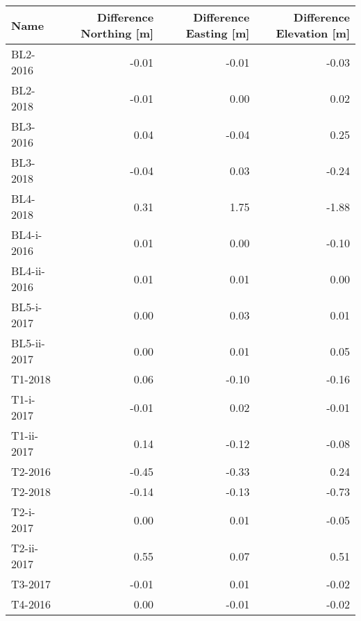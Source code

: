 \begin{tabular}{lrrr}
\toprule
        Name &  Difference Northing [m] &  Difference Easting [m] &  Difference Elevation [m] \\
\midrule
    BL2-2016 &                    -0.01 &                   -0.01 &                     -0.03 \\
    BL2-2018 &                    -0.01 &                    0.00 &                      0.02 \\
    BL3-2016 &                     0.04 &                   -0.04 &                      0.25 \\
    BL3-2018 &                    -0.04 &                    0.03 &                     -0.24 \\
    BL4-2018 &                     0.31 &                    1.75 &                     -1.88 \\
  BL4-i-2016 &                     0.01 &                    0.00 &                     -0.10 \\
 BL4-ii-2016 &                     0.01 &                    0.01 &                      0.00 \\
  BL5-i-2017 &                     0.00 &                    0.03 &                      0.01 \\
 BL5-ii-2017 &                     0.00 &                    0.01 &                      0.05 \\
     T1-2018 &                     0.06 &                   -0.10 &                     -0.16 \\
   T1-i-2017 &                    -0.01 &                    0.02 &                     -0.01 \\
  T1-ii-2017 &                     0.14 &                   -0.12 &                     -0.08 \\
     T2-2016 &                    -0.45 &                   -0.33 &                      0.24 \\
     T2-2018 &                    -0.14 &                   -0.13 &                     -0.73 \\
   T2-i-2017 &                     0.00 &                    0.01 &                     -0.05 \\
  T2-ii-2017 &                     0.55 &                    0.07 &                      0.51 \\
     T3-2017 &                    -0.01 &                    0.01 &                     -0.02 \\
     T4-2016 &                     0.00 &                   -0.01 &                     -0.02 \\

\end{tabular}
